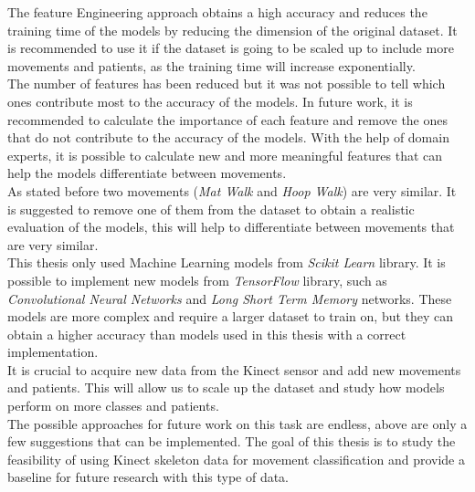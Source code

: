         The feature Engineering approach obtains a high accuracy and reduces the training time of the models by reducing the dimension of the original dataset. It is recommended to use it if the dataset is going to be scaled up to include more movements and patients, as the training time will increase exponentially.\\
        The number of features has been reduced but it was not possible to tell which ones contribute most to the accuracy of the models. In future work, it is recommended to calculate the importance of each feature and remove the ones that do not contribute to the accuracy of the models. With the help of domain experts, it is possible to calculate new and more meaningful features that can help the models differentiate between movements. \\
        As stated before two movements (\textit{Mat Walk} and \textit{Hoop Walk}) are very similar. It is suggested to remove one of them from the dataset to obtain a realistic evaluation of the models, this will help to differentiate between movements that are very similar.\\
        
        This thesis only used Machine Learning models from \textit{Scikit Learn} library. It is possible to implement new models from \textit{TensorFlow} library, such as \textit{Convolutional Neural Networks} and \textit{Long Short Term Memory} networks. These models are more complex and require a larger dataset to train on, but they can obtain a higher accuracy than models used in this thesis with a correct implementation. \\
        It is crucial to acquire new data from the Kinect sensor and add new movements and patients. This will allow us to scale up the dataset and study how models perform on more classes and patients. \\

        The possible approaches for future work on this task are endless, above are only a few suggestions that can be implemented. The goal of this thesis is to study the feasibility of using Kinect skeleton data for movement classification and provide a baseline for future research with this type of data. \\
    
    \cleardoublepage
